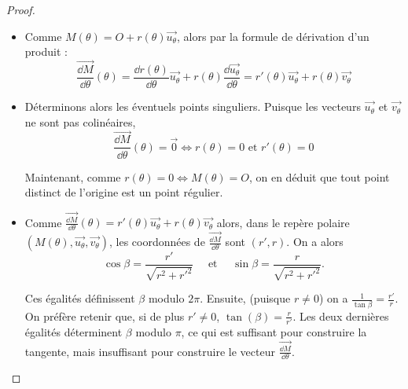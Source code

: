 \documentclass[class=report,crop=false]{standalone}
\begin{document}
\begin{proof}
~
\begin{itemize}
  \item Comme $M(\theta) = O+r(\theta) \overrightarrow{u_\theta}$, alors par la formule de dérivation d'un produit :
$$\overrightarrow{\frac{\dd M}{\dd \theta}}(\theta)
= \frac{\dd r(\theta)}{\dd \theta}\overrightarrow{u_\theta}
+ r(\theta)\frac{\dd \overrightarrow{u_\theta}}{\dd \theta}
=r'(\theta)\overrightarrow{u_\theta}+r(\theta)\overrightarrow{v_\theta}$$

  \item Déterminons alors les éventuels points singuliers. Puisque les
vecteurs $\overrightarrow{u_\theta}$ et $\overrightarrow{v_\theta}$
ne sont pas colinéaires,
$$\overrightarrow{\frac{\dd M}{\dd\theta}}(\theta)
=\overrightarrow{0} \iff r(\theta)=0 \text{ et } r'(\theta)=0$$

Maintenant, comme $r(\theta)=0 \iff M(\theta)=O$, on en déduit que
tout point distinct de l'origine est un point régulier.

  \item Comme $\overrightarrow{\frac{\dd M}{\dd \theta}}(\theta)
=r'(\theta)\overrightarrow{u_\theta}+r(\theta)\overrightarrow{v_\theta}$
alors, dans le repère polaire
$(M(\theta),\overrightarrow{u_\theta},\overrightarrow{v_\theta})$,
les coordonnées de $\overrightarrow{\frac{\dd M}{\dd\theta}}$ sont $(r',r)$.
On a alors
$$\cos\beta=\frac{r'}{\sqrt{r^2+r'^2}} \quad \text{ et } \quad \sin\beta = \frac{r}{\sqrt{r^2+r'^2}}.$$

Ces égalités définissent $\beta$ modulo $2\pi$. Ensuite, (puisque $r\neq0$) on a
$\frac{1}{\tan\beta}=\frac{r'}{r}$.
On préfère retenir que,
si de plus $r'\neq0$, $\tan(\beta)=\frac{r}{r'}$.
Les deux dernières égalités déterminent $\beta$ modulo $\pi$, ce qui
est suffisant pour construire la tangente, mais
insuffisant pour construire le vecteur $\overrightarrow{\frac{\dd M}{\dd\theta}}$.
\end{itemize}

\end{proof}
\end{document}
